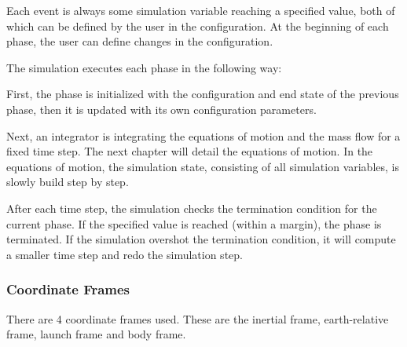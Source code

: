 Each event is always some simulation variable reaching a specified value, both
of which can be defined by the user in the configuration. At the beginning of
each phase, the user can define changes in the configuration.

The simulation executes each phase in the following way:

First, the phase is initialized with the configuration and end state of the
previous phase, then it is updated with its own configuration parameters.

Next, an integrator is integrating the equations of motion and the mass flow
for a fixed time step. The next chapter will detail the equations of motion.
In the equations of motion, the simulation state, consisting of all simulation
variables, is slowly build step by step.

After each time step, the simulation checks the termination condition for the
current phase. If the specified value is reached (within a margin), the phase
is terminated. If the simulation overshot the termination condition, it will
compute a smaller time step and redo the simulation step.

\subsubsection{Coordinate Frames}\label{coordinate-frames}

There are 4 coordinate frames used. These are the inertial frame,
earth-relative frame, launch frame and body frame.


